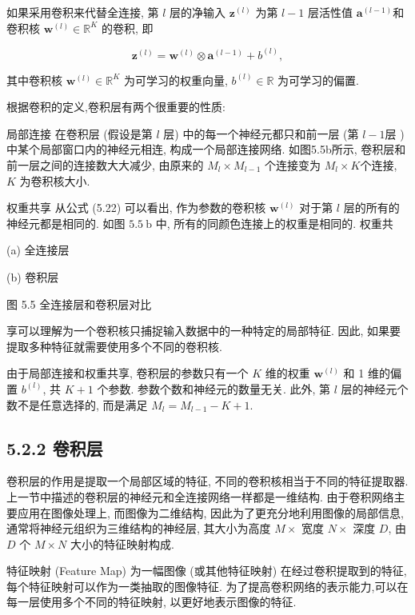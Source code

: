 \documentclass[10pt]{article}
\begin{document}
如果采用卷积来代替全连接, 第 $l$ 层的净输入 $\boldsymbol{z}^{(l)}$ 为第 $l-1$ 层活性值 $\boldsymbol{a}^{(l-1)}$和卷积核 $\boldsymbol{w}^{(l)} \in \mathbb{R}^{K}$ 的卷积, 即


\begin{equation*}
\boldsymbol{z}^{(l)}=\boldsymbol{w}^{(l)} \otimes \boldsymbol{a}^{(l-1)}+b^{(l)}, \tag{5.22}
\end{equation*}


其中卷积核 $\boldsymbol{w}^{(l)} \in \mathbb{R}^{K}$ 为可学习的权重向量, $b^{(l)} \in \mathbb{R}$ 为可学习的偏置.

根据卷积的定义,卷积层有两个很重要的性质:

局部连接 在卷积层 (假设是第 $l$ 层) 中的每一个神经元都只和前一层 (第 $l-1$层 ) 中某个局部窗口内的神经元相连, 构成一个局部连接网络. 如图5.5b所示, 卷积层和前一层之间的连接数大大减少, 由原来的 $M_{l} \times M_{l-1}$ 个连接变为 $M_{l} \times K$个连接, $K$ 为卷积核大小.

权重共享 从公式 (5.22) 可以看出, 作为参数的卷积核 $\boldsymbol{w}^{(l)}$ 对于第 $l$ 层的所有的神经元都是相同的. 如图 $5.5 \mathrm{~b}$ 中, 所有的同颜色连接上的权重是相同的. 权重共



(a) 全连接层



(b) 卷积层

图 5.5 全连接层和卷积层对比

享可以理解为一个卷积核只捕捉输入数据中的一种特定的局部特征. 因此, 如果要提取多种特征就需要使用多个不同的卷积核.

由于局部连接和权重共享, 卷积层的参数只有一个 $K$ 维的权重 $\boldsymbol{w}^{(l)}$ 和 1 维的偏置 $b^{(l)}$, 共 $K+1$ 个参数. 参数个数和神经元的数量无关. 此外, 第 $l$ 层的神经元个数不是任意选择的, 而是满足 $M_{l}=M_{l-1}-K+1$.

\subsection*{5.2.2 卷积层}
卷积层的作用是提取一个局部区域的特征, 不同的卷积核相当于不同的特征提取器. 上一节中描述的卷积层的神经元和全连接网络一样都是一维结构. 由于卷积网络主要应用在图像处理上, 而图像为二维结构, 因此为了更充分地利用图像的局部信息, 通常将神经元组织为三维结构的神经层, 其大小为高度 $M \times$ 宽度 $N \times$ 深度 $D$, 由 $D$ 个 $M \times N$ 大小的特征映射构成.

特征映射 (Feature Map) 为一幅图像 (或其他特征映射) 在经过卷积提取到的特征, 每个特征映射可以作为一类抽取的图像特征. 为了提高卷积网络的表示能力,可以在每一层使用多个不同的特征映射, 以更好地表示图像的特征.
\end{document}
